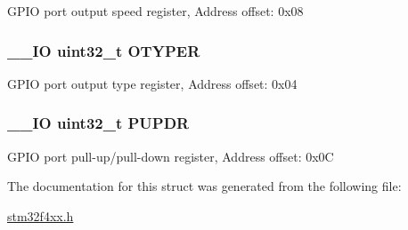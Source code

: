 G\-P\-I\-O port output speed register, Address offset\-: 0x08 \hypertarget{struct_g_p_i_o___type_def_a9543592bda60cb5261075594bdeedac9}{
\subsubsection[{O\-T\-Y\-P\-E\-R}]{\setlength{\rightskip}{0pt plus 5cm}\-\_\-\-\_\-\-I\-O uint32\-\_\-t O\-T\-Y\-P\-E\-R}}\label{struct_g_p_i_o___type_def_a9543592bda60cb5261075594bdeedac9}
G\-P\-I\-O port output type register, Address offset\-: 0x04 \hypertarget{struct_g_p_i_o___type_def_abeed38529bd7b8de082e490e5d4f1727}{
\subsubsection[{P\-U\-P\-D\-R}]{\setlength{\rightskip}{0pt plus 5cm}\-\_\-\-\_\-\-I\-O uint32\-\_\-t P\-U\-P\-D\-R}}\label{struct_g_p_i_o___type_def_abeed38529bd7b8de082e490e5d4f1727}
G\-P\-I\-O port pull-\/up/pull-\/down register, Address offset\-: 0x0\-C 

The documentation for this struct was generated from the following file\-:\begin{DoxyCompactItemize}
\item 
\hyperlink{stm32f4xx_8h}{stm32f4xx.\-h}\end{DoxyCompactItemize}
